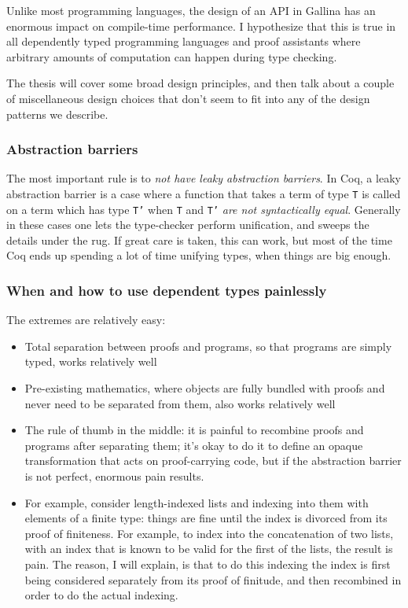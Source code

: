 \documentclass[twoside]{article}
\begin{document}
Unlike most programming languages, the design of an API in Gallina has an enormous impact on compile-time performance.
I hypothesize that this is true in all dependently typed programming languages and proof assistants where arbitrary amounts of computation can happen during type checking.

The thesis will cover some broad design principles, and then talk about a couple of miscellaneous design choices that don't seem to fit into any of the design patterns we describe.

\subsubsection{Abstraction barriers}
The most important rule is to \emph{not have leaky abstraction barriers}.
In Coq, a leaky abstraction barrier is a case where a function that takes a term of type \texttt{T} is called on a term which has type \texttt{T'} when \texttt{T} and \texttt{T'} \emph{are not syntactically equal}.
Generally in these cases one lets the type-checker perform unification, and sweeps the details under the rug.
If great care is taken, this can work, but most of the time Coq ends up spending a lot of time unifying types, when things are big enough.

\subsubsection{When and how to use dependent types painlessly}
The extremes are relatively easy:
\begin{itemize}
\item Total separation between proofs and programs, so that programs are simply typed, works relatively well
\item Pre-existing mathematics, where objects are fully bundled with proofs and never need to be separated from them, also works relatively well
\item The rule of thumb in the middle: it is painful to recombine proofs and programs after separating them; it's okay to do it to define an opaque transformation that acts on proof-carrying code, but if the abstraction barrier is not perfect, enormous pain results.
\item For example, consider length-indexed lists and indexing into them with elements of a finite type: things are fine until the index is divorced from its proof of finiteness.  For example, to index into the concatenation of two lists, with an index that is known to be valid for the first of the lists, the result is pain.  The reason, I will explain, is that to do this indexing the index is first being considered separately from its proof of finitude, and then recombined in order to do the actual indexing.
\end{itemize}
\end{document}
